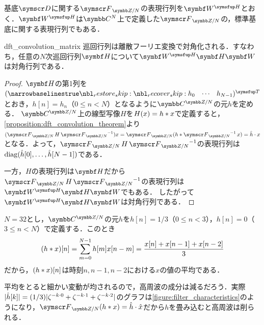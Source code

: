 \documentclass[../../main]{subfiles}
\begin{document}
基底\(\basis{D}\)に関する\(\dft{N}\)の表現行列を\(\htrps{\mat{W}}\)とおく．\(\htrps{\mat{W}}\)は\(\numset{C}^N\)上で定義した\(\dft{N}\)の，標準基底に関する表現行列でもある．

\begin{corollary}{}{dft_convolution_matrix}
  巡回行列は離散フーリエ変換で対角化される．すなわち，任意の\(N\)次巡回行列\(\mat{H}\)について\(\htrps{\mat{W}}\mat{H}\mat{W}\)は対角行列である．
\end{corollary}

\begin{proof}
  \(\mat{H}\)の第1列を\(\trps{\rowvect{h_0 & \cdots & h_{N-1}}}\)とおき，\(h[n]=h_n\)（\(0\leq n<N\)）となるように\(\cycles{\numset{C}}{N}\)の元\(h\)を定める．
  \(\cycles{\numset{C}}{N}\)上の線型写像\(H\)を\(H(x)=h\ast x\)で定義すると，\cref{proposition:dft_convolution_theorem}より\((\dft{N}H\dft{N}^{-1})x=\dft{N}(h\circconv\dft{N}^{-1}x)=\hat{h}\cdot x\)となる．よって，\(\dft{N}H\dft{N}^{-1}\)の表現行列は\(\operatorname{diag}(\hat{h}[0],\dots,\hat{h}[N-1])\)である．

  一方，\(H\)の表現行列は\(\mat{H}\)だから\(\dft{N}H\dft{N}^{-1}\)の表現行列は\(\htrps{\mat{W}}\mat{H}\mat{W}\)でもある．
  したがって\(\htrps{\mat{W}}\mat{H}\mat{W}\)は対角行列である．
\end{proof}

\begin{example}
  \label{example:cyclic_filter}
  \(N=32\)とし，\(\cycles{\numset{C}}{N}\)の元\(h\)を\(h[n]=1/3\)（\(0\leq n<3\)），\(h[n]=0\)（\(3\leq n<N\)）で定義する．このとき
  \[
    (h\ast x)[n] = \sum_{m=0}^{N-1}h[m]x[n-m]
    = \frac{x[n]+x[n-1]+x[n-2]}{3}
  \]
  だから，\((h\ast x)[n]\)は時刻\(n,n-1,n-2\)における\(x\)の値の平均である．

  平均をとると細かい変動が均されるので，高周波の成分は減るだろう．実際\(\lvert\hat{h}[k]\rvert=(1/3)\lvert\zeta^{-k\cdot 0}+\zeta^{-k\cdot 1}+\zeta^{-k\cdot 2}\rvert\)のグラフは\cref{figure:filter_characteristics}のようになり，\(\dft{N}(h\circconv x)=\hat{h}\cdot\hat{x}\)だから\(h\)を畳み込むと高周波は削られる．
\end{example}
\end{document}
